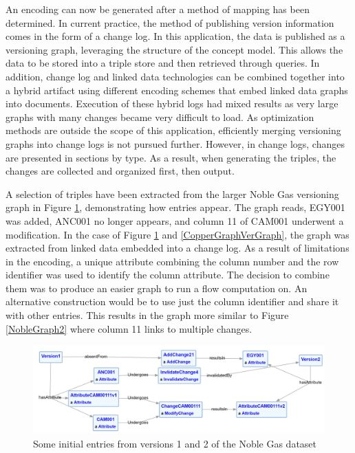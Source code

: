 An encoding can now be generated after a method of mapping has been determined.
In current practice, the method of publishing version information comes in the form of a change log.
In this application, the data is published as a versioning graph, leveraging the structure of the concept model.
This allows the data to be stored into a triple store and then retrieved through queries.
In addition, change log and linked data technologies can be combined together into a hybrid artifact using different encoding schemes that embed linked data graphs into documents.
Execution of these hybrid logs had mixed results as very large graphs with many changes became very difficult to load.
As optimization methods are outside the scope of this application, efficiently merging versioning graphs into change logs is not pursued further.
However, in change logs, changes are presented in sections by type.
As a result, when generating the triples, the changes are collected and organized first, then output.

A selection of triples have been extracted from the larger Noble Gas versioning graph in Figure \ref{NobleGraph1}, demonstrating how entries appear.
The graph reads, EGY001 was added, ANC001 no longer appears, and column 11 of CAM001 underwent a modification.
In the case of Figure \ref{NobleGraph1} and \ref{CopperGraphVerGraph}, the graph was extracted from linked data embedded into a change log.
As a result of limitations in the encoding, a unique attribute combining the column number and the row identifier was used to identify the column attribute.
The decision to combine them was to produce an easier graph to run a flow computation on.
An alternative construction would be to use just the column identifier and share it with other entries.
This results in the graph more similar to Figure \ref{NobleGraph2} where column 11 links to multiple changes.

\begin{figure}
	\centering
	\includegraphics[scale=0.30]{figures/NobleVersion.png}
	\caption{Some initial entries from versions 1 and 2 of the Noble Gas dataset}
	\label{NobleGraph1}
\end{figure}


